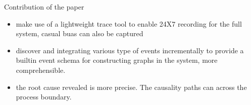Contribution of the paper
\begin {itemize}
\item make use of a lightweight trace tool to enable 24X7 recording for the full system, casual buas can also be captured
\item discover and integrating various type of events incrementally to provide a builtin event schema for constructing graphs in the system, more comprehensible.
\item the root cause revealed is more precise. The causality paths can across the process boundary.
\end{itemize}
